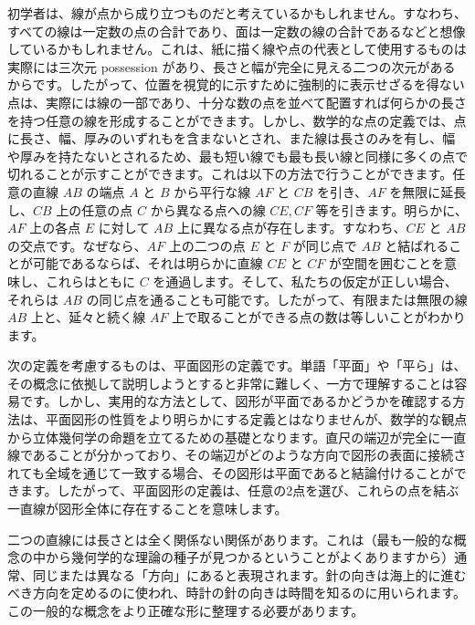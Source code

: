 \documentclass[a4paper,11pt,openany]{ltjsbook}
\begin{document}
初学者は、線が点から成り立つものだと考えているかもしれません。すなわち、すべての線は一定数の点の合計であり、面は一定数の線の合計であるなどと想像しているかもしれません。これは、紙に描く線や点の代表として使用するものは実際には三次元 possession があり、長さと幅が完全に見える二つの次元があるからです。したがって、位置を視覚的に示すために強制的に表示せざるを得ない点は、実際には線の一部であり、十分な数の点を並べて配置すれば何らかの長さを持つ任意の線を形成することができます。しかし、数学的な点の定義では、点に長さ、幅、厚みのいずれもを含まないとされ、また線は長さのみを有し、幅や厚みを持たないとされるため、最も短い線でも最も長い線と同様に多くの点で切れることが示すことができます。これは以下の方法で行うことができます。任意の直線 $AB$ の端点 $A$ と $B$ から平行な線 $AF$ と $CB$ を引き、$AF$ を無限に延長し、$CB$ 上の任意の点 $C$ から異なる点への線 $CE, CF$ 等を引きます。明らかに、$AF$ 上の各点 $E$ に対して $AB$ 上に異なる点が存在します。すなわち、$CE$ と $AB$ の交点です。なぜなら、$AF$ 上の二つの点 $E$ と $F$ が同じ点で $AB$ と結ばれることが可能であるならば、それは明らかに直線 $CE$ と $CF$ が空間を囲むことを意味し、これらはともに $C$ を通過します。そして、私たちの仮定が正しい場合、それらは $AB$ の同じ点を通ることも可能です。したがって、有限または無限の線 $AB$ 上と、延々と続く線 $AF$ 上で取ることができる点の数は等しいことがわかります。

次の定義を考慮するものは、平面図形の定義です。単語「平面」や「平ら」は、その概念に依拠して説明しようとすると非常に難しく、一方で理解することは容易です。しかし、実用的な方法として、図形が平面であるかどうかを確認する方法は、平面図形の性質をより明らかにする定義とはなりませんが、数学的な観点から立体幾何学の命題を立てるための基礎となります。直尺の端辺が完全に一直線であることが分かっており、その端辺がどのような方向で図形の表面に接続されても全域を通じて一致する場合、その図形は平面であると結論付けることができます。したがって、平面図形の定義は、任意の2点を選び、これらの点を結ぶ一直線が図形全体に存在することを意味します。

二つの直線には長さとは全く関係ない関係があります。これは（最も一般的な概念の中から幾何学的な理論の種子が見つかるということがよくありますから）通常、同じまたは異なる「方向」にあると表現されます。針の向きは海上的に進むべき方向を定めるのに使われ、時計の針の向きは時間を知るのに用いられます。この一般的な概念をより正確な形に整理する必要があります。
\end{document}
